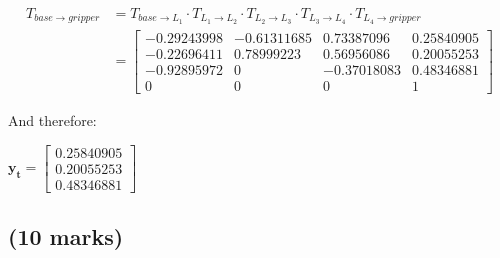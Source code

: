 \begin{align*}
    T_{base \rightarrow gripper} &=
        T_{base \rightarrow L_1} \cdot
        T_{L_1 \rightarrow L_2} \cdot
        T_{L_2 \rightarrow L_3} \cdot
        T_{L_3 \rightarrow L_4} \cdot
        T_{L_4 \rightarrow gripper}\\
        &=
        \begin{bmatrix}
            -0.29243998 & -0.61311685 &  0.73387096 & 0.25840905 \\
            -0.22696411 &  0.78999223 &  0.56956086 & 0.20055253 \\
            -0.92895972 &  0          & -0.37018083 & 0.48346881 \\
             0          &  0          &  0          & 1
        \end{bmatrix}
\end{align*}

And therefore:

\begin{center}
    $ \boldsymbol{y_t} =
        \begin{bmatrix}
            0.25840905 \\
            0.20055253 \\
            0.48346881
        \end{bmatrix} $
\end{center}

\clearpage


\subsection{(10 marks)}

